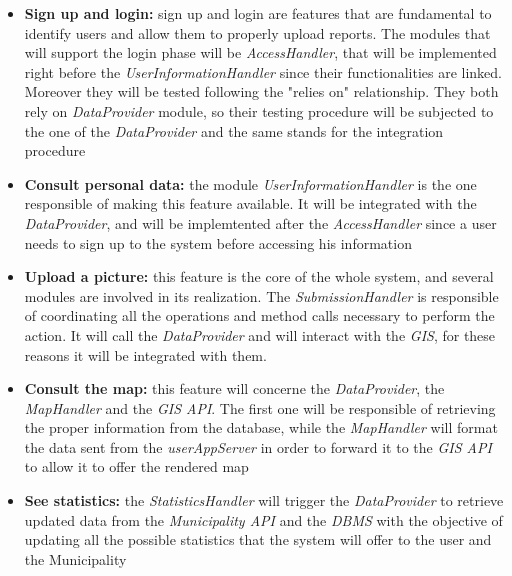         \begin{itemize}
            \item \textbf{Sign up and login:} sign up and login are features that are fundamental to identify users and allow them to 
                properly upload reports. The modules that will support the login phase will be \emph{AccessHandler}, that will be 
                implemented right before the \emph{UserInformationHandler} since their functionalities are linked. Moreover they 
                will be tested following the "relies on" relationship. They both rely on \emph{DataProvider} module, so their testing 
                procedure will be subjected to the one of the \emph{DataProvider} and the same stands for the integration procedure
            \item \textbf{Consult personal data:} the module \emph{UserInformationHandler} is the one responsible of making this feature 
                available. It will be integrated with the \emph{DataProvider}, and will be implemtented after the \emph{AccessHandler} since
                a user needs to sign up to the system before accessing his information
            \item \textbf{Upload a picture:} this feature is the core of the whole system, and several modules are involved in its 
                realization. The \emph{SubmissionHandler} is responsible of coordinating all the operations and method calls necessary 
                to perform the action. It will call the \emph{DataProvider} and will interact with the \emph{GIS}, for these reasons it
                will be integrated with them.
            \item \textbf{Consult the map:} this feature will concerne the \emph{DataProvider}, the \emph{MapHandler} and the 
                \emph{GIS API}. The first one will be responsible of retrieving the proper information from the database, 
                while the \emph{MapHandler} will format the data sent from the \emph{userAppServer} in order to forward it to the 
                \emph{GIS API} to allow it to offer the rendered map
            \item \textbf{See statistics:} the \emph{StatisticsHandler} will trigger the \emph{DataProvider} to retrieve updated
                data from the \emph{Municipality API} and the \emph{DBMS} with the objective of updating all the possible 
                statistics that the system will offer to the user and the Municipality
        \end{itemize}
       
